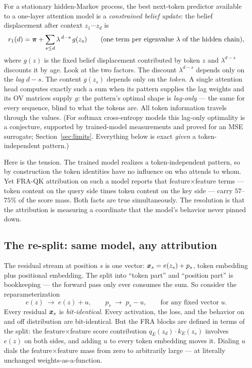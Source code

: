 \documentclass{article}
\begin{document}
For a stationary hidden-Markov process, the best next-token predictor available to a one-layer attention model is a \emph{constrained belief update}: the belief displacement after context $z_1 \cdots z_d$ is
\begin{equation}\label{eq:r1}
    r_1(d) = \boldsymbol{\pi} + \sum_{s \le d} \lambda^{\,d-s}\, g(z_s) \qquad (\text{one term per eigenvalue } \lambda \text{ of the hidden chain}),
\end{equation}
where $g(z)$ is the fixed belief displacement contributed by token $z$ and $\lambda^{d-s}$ discounts it by age. Look at the two factors. The discount $\lambda^{d-s}$ depends only on the \emph{lag} $d - s$. The content $g(z_s)$ depends only on the \emph{token}. A single attention head computes exactly such a sum when its pattern supplies the lag weights and its OV matrices supply $g$: the pattern's optimal shape is \emph{lag-only} --- the same for every sequence, blind to what the tokens are. All token information travels through the values. (For softmax cross-entropy models this lag-only optimality is a conjecture, supported by trained-model measurements and proved for an MSE surrogate; Section~\ref{sec:limits}. Everything below is exact \emph{given} a token-independent pattern.)

Here is the tension. The trained model realizes a token-independent pattern, so by construction the token identities have no influence on who attends to whom. Yet FRA-QK attribution on such a model reports that feature$\times$feature terms --- token content on the query side times token content on the key side --- carry $57$--$75\%$ of the score mass. Both facts are true simultaneously. The resolution is that the attribution is measuring a coordinate that the model's behavior never pinned down.

\subsection{The re-split: same model, any attribution}

The residual stream at position $s$ is one vector: $\boldsymbol{x}_s = e(z_s) + p_s$, token embedding plus positional embedding. The split into ``token part'' and ``position part'' is bookkeeping --- the forward pass only ever consumes the sum. So consider the reparameterization
\begin{equation*}
    e(z) \;\to\; e(z) + u, \qquad p_s \;\to\; p_s - u, \qquad \text{for any fixed vector } u .
\end{equation*}
Every residual $\boldsymbol{x}_s$ is \emph{bit-identical}. Every activation, the loss, and the behavior on and off distribution are bit-identical. But the FRA blocks are defined in terms of the split: the feature$\times$feature score contribution $q_E(z_d)\cdot k_E(z_s)$ involves $e(z)$ on both sides, and adding $u$ to every token embedding moves it. Dialing $u$ dials the feature$\times$feature mass from zero to arbitrarily large --- at literally unchanged weights-as-a-function.
\end{document}
